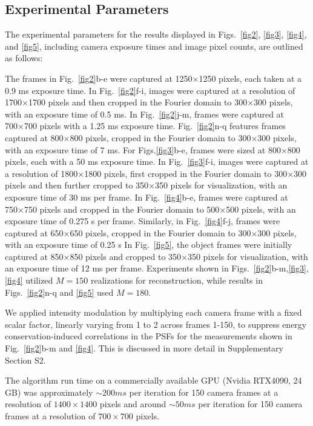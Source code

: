 \documentclass[pdflatex,sn-mathphys-num]{sn-jnl}%
\theoremstyle{thmstyleone}%
\theoremstyle{thmstyletwo}%
\theoremstyle{thmstylethree}%
\begin{document}
\subsection*{Experimental Parameters}

The experimental parameters for the results displayed in Figs.~\ref{fig2}, \ref{fig3}, \ref{fig4}, and \ref{fig5}, including camera exposure times and image pixel counts, are outlined as follows:

The frames in Fig.~\ref{fig2}b-e were captured at 1250×1250 pixels, each taken at a 0.9 ms exposure time. In Fig.~\ref{fig2}f-i, images were captured at a resolution of 1700×1700 pixels and then cropped in the Fourier domain to 300×300 pixels, with an exposure time of 0.5 ms. In Fig.~\ref{fig2}j-m, frames were captured at 700×700 pixels with a 1.25 ms exposure time. Fig.~\ref{fig2}n-q features frames captured at 800×800 pixels, cropped in the Fourier domain to 300×300 pixels, with an exposure time of 7 ms.
For Figs.\ref{fig3}b-e, frames were sized at 800×800 pixels, each with a 50 ms exposure time. In Fig.~\ref{fig3}f-i, images were captured at a resolution of 1800×1800 pixels, first cropped in the Fourier domain to 300×300 pixels and then further cropped to 350×350 pixels for visualization, with an exposure time of 30 ms per frame.
In Fig.~\ref{fig4}b-e, frames were captured at 750×750 pixels and cropped in the Fourier domain to 500×500 pixels, with an exposure time of 0.275 s per frame. Similarly, in Fig.~\ref{fig4}f-j, frames were captured at 650×650 pixels, cropped in the Fourier domain to 300×300 pixels, with an exposure time of 0.25 s
In Fig.~\ref{fig5}, the object frames were initially captured at 850×850 pixels and cropped to 350×350 pixels for visualization, with an exposure time of 12 ms per frame.
Experiments shown in Figs.~\ref{fig2}b-m,\ref{fig3},\ref{fig4} utilized $M=150$ realizations for reconstruction, while results in Figs.~\ref{fig2}n-q 
and \ref{fig5} used $M=180$.

We applied intensity modulation by multiplying each camera frame with a fixed scalar factor, linearly varying from 1 to 2 across frames 1-150, to suppress energy conservation-induced correlations in the PSFs for the measurements shown in Fig.~\ref{fig2}b-m and \ref{fig4}. This is discussed in more detail in Supplementary Section S2.

The algorithm run time on a commercially available GPU (Nvidia RTX4090, 24 GB) was approximately $\sim 200ms$ per iteration for 150 camera frames at a resolution of $1400 \times 1400$ pixels and around $\sim 50ms$ per iteration for 150 camera frames at a resolution of $700 \times 700$ pixels.
\end{document}
